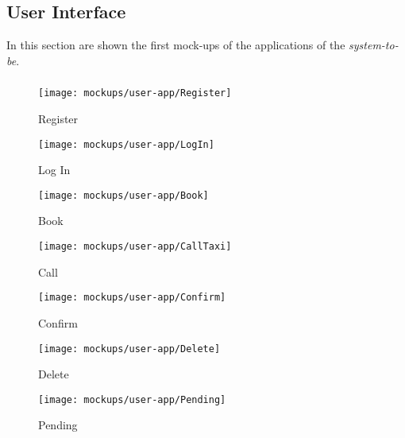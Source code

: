 
\subsection{User Interface} %
In this section are shown the first mock-ups of the applications of the \emph{system-to-be}.

\subsubsection{ }
\begin{figure*}[h!t]
    \centering
    \begin{subfigure}[h!t]{0.25\paperwidth}
            \texttt{[image: mockups/user-app/Register]}
            \caption{Register}
    \end{subfigure}
    \hspace{0.05\paperwidth}
    \begin{subfigure}[h!t]{0.25\paperwidth}
            \texttt{[image: mockups/user-app/LogIn]}
            \caption{Log In}
    \end{subfigure}
\end{figure*}
\vfill
\clearpage

\newpage
\vfill
\begin{figure*}[h!t]
    \centering
    \begin{subfigure}[h!t]{0.25\paperwidth}
            \texttt{[image: mockups/user-app/Book]}
            \caption{Book}
    \end{subfigure}
    \hspace{0.05\paperwidth}
    \begin{subfigure}[h!t]{0.25\paperwidth}
            \texttt{[image: mockups/user-app/CallTaxi]}
            \caption{Call}
    \end{subfigure}
\end{figure*}
\vfill
\clearpage

\newpage
\vfill
\begin{figure*}[h!t]
    \centering
    \begin{subfigure}[h!t]{0.25\paperwidth}
            \texttt{[image: mockups/user-app/Confirm]}
            \caption{Confirm}
    \end{subfigure}
    \hspace{0.05\paperwidth}
    \begin{subfigure}[h!t]{0.25\paperwidth}
            \texttt{[image: mockups/user-app/Delete]}
            \caption{Delete}
    \end{subfigure}

    \begin{subfigure}[h!t]{0.25\paperwidth}
            \texttt{[image: mockups/user-app/Pending]}
            \caption{Pending}
    \end{subfigure}

\end{figure*}
\vfill
\clearpage

\subsubsection{ }

